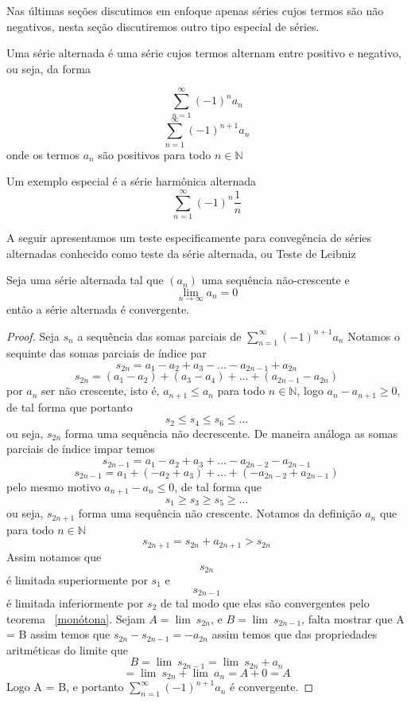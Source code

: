 Nas últimas seções discutimos em enfoque apenas séries cujos termos são não
negativos, nesta seção discutiremos outro tipo especial de séries.

Uma série alternada é uma série cujos termos alternam entre positivo e negativo,
ou seja, da forma 

$$\sum_{n =1}^{\infty} (-1)^n a_n$$
$$\sum_{n =1}^{\infty} (-1)^{n+1} a_n$$
onde os termos $a_n$ são positivos para todo $n \in \mathbb{N}$
\begin{ex}
    Um exemplo especial é a série harmônica alternada
    $$\sum_{n =1}^{\infty} (-1)^n \frac{1}{n}$$
\end{ex}

A seguir apresentamos um teste especificamente para convegência 
de séries alternadas conhecido como teste da série alternada, ou Teste de Leibniz

\begin{teo}
    Seja uma série alternada tal que $(a_n)$ uma sequência não-crescente e
    $$\lim_{n \to \infty} a_n = 0$$
    então a série alternada é convergente.
\end{teo}

\begin{proof}
    Seja $s_n$ a sequência das somas parciais de $\sum_{n =1}^{\infty} (-1)^{n+1} a_n$
    Notamos o sequinte das somas parciais de índice par
    $$s_{2n} = a_1 - a_2 +a_3 - \dots -a_{2n-1} + a_{2n}$$
    $$s_{2n} = (a_1 - a_2) + (a_3 - a_4) + \dots + (a_{2n-1} - a_{2n})$$
    por $a_n$ ser não crescente, isto é, $a_{n+1} \leq a_n$ para todo $n \in \mathbb{N}$,
    logo $a_n - a_{n+1} \geq 0$, de tal forma que portanto
    $$s_2 \leq s_4 \leq s_6 \leq  \dots $$
    ou seja, $s_{2n}$ forma uma sequência não decrescente.
    De maneira análoga as somas parciais de índice impar temos
    $$s_{2n-1} = a_1 - a_2 +a_3 + \dots -a_{2n-2} - a_{2n-1}$$
    $$s_{2n-1} =a_1 +(- a_2 + a_3) + \dots + (-a_{2n-2} + a_{2n-1})$$
    pelo mesmo motivo $a_{n+1} - a_n \leq 0$, de tal forma que
    $$s_1 \geq s_3 \geq s_5 \geq \dots $$
    ou seja, $s_{2n+1}$ forma uma sequência não crescente.
    Notamos da definição $a_n$ que para todo $n \in \mathbb{N}$
    $$ s_{2n+1} = s_{2n} + a_{2n+1} > s_{2n}$$
    Assim notamos que $$s_{2n}$$ é limitada superiormente por $s_1$ e
    $$s_{2n-1}$$ é limitada inferiormente por $s_2$ de tal modo que elas são
    convergentes pelo teorema ~\ref{monótona}.
    Sejam $A = \lim{\:} s_{2n}$, e $B = \lim{\:} s_{2n-1}$, falta mostrar que A = B
    assim temos que $s_{2n} - s_{2n-1} = -a_{2n}$ assim temos que
    das propriedades aritméticas do limite que
    $$ B = \lim{\:} s_{2n-1} = \lim{\:} s_{2n} + a_n$$
    $$ = \lim{\:} s_{2n} + \lim{\:} a_n = A + 0 = A$$
    Logo A = B, e portanto $\sum_{n =1}^{\infty} (-1)^{n+1} a_n$ é convergente.
\end{proof}

